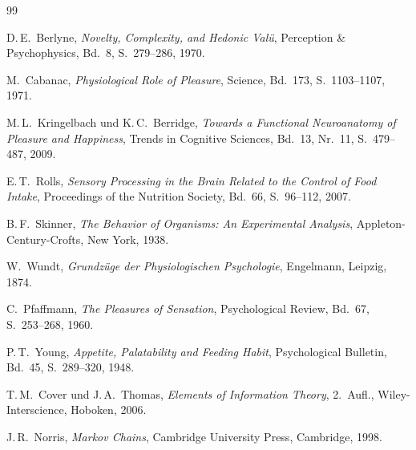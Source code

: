 ﻿\documentclass[12pt,a4paper]{article}
\theoremstyle{definition}
\begin{document}
\begin{thebibliography}{99}

D.\,E.\ Berlyne,
\textit{Novelty, Complexity, and Hedonic Valü},
Perception \& Psychophysics, Bd.\ 8, S.\ 279--286, 1970.

M.\ Cabanac,
\textit{Physiological Role of Pleasure},
Science, Bd.\ 173, S.\ 1103--1107, 1971.

M.\,L.\ Kringelbach und K.\,C.\ Berridge,
\textit{Towards a Functional Neuroanatomy of Pleasure and Happiness},
Trends in Cognitive Sciences, Bd.\ 13, Nr.\ 11, S.\ 479--487, 2009.

E.\,T.\ Rolls,
\textit{Sensory Processing in the Brain Related to the Control of Food Intake},
Proceedings of the Nutrition Society, Bd.\ 66, S.\ 96--112, 2007.

B.\,F.\ Skinner,
\textit{The Behavior of Organisms: An Experimental Analysis},
Appleton-Century-Crofts, New York, 1938.

W.\ Wundt,
\textit{Grundzüge der Physiologischen Psychologie},
Engelmann, Leipzig, 1874.

C.\ Pfaffmann,
\textit{The Pleasures of Sensation},
Psychological Review, Bd.\ 67, S.\ 253--268, 1960.

P.\,T.\ Young,
\textit{Appetite, Palatability and Feeding Habit},
Psychological Bulletin, Bd.\ 45, S.\ 289--320, 1948.

T.\,M.\ Cover und J.\,A.\ Thomas,
\textit{Elements of Information Theory}, 2.\ Aufl.,
Wiley-Interscience, Hoboken, 2006.

J.\,R.\ Norris,
\textit{Markov Chains},
Cambridge University Press, Cambridge, 1998.

\end{thebibliography}
\end{document}
